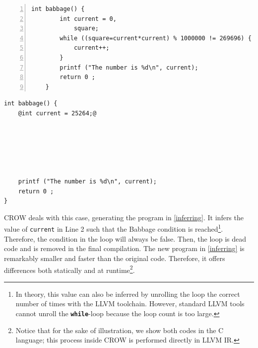 {


\begin{minipage}[t]{0.43\linewidth}
    \begin{lstlisting}[numbers=left]
    int babbage() {
        int current = 0,
            square;
        while ((square=current*current) % 1000000 != 269696) {
            current++;
        }
        printf ("The number is %d\n", current);
        return 0 ;
    }
    \end{lstlisting}
\end{minipage}\hfill
\begin{minipage}[t]{0.44\linewidth}
    \begin{lstlisting}[]
int babbage() {
    @int current = 25264;@
    
    




    printf ("The number is %d\n", current);
    return 0 ;
}
    \end{lstlisting}
\end{minipage}
}

CROW deals with this case, generating the program in \autoref{inferring}. It infers the value of \texttt{current} in Line 2 such that the Babbage condition is reached\footnote{
    In theory, this value can also be inferred by unrolling the loop the correct number of times with the LLVM toolchain.
    However, standard LLVM tools cannot unroll the \texttt{\textbf{while}}-loop because the loop count is too large.}. 
Therefore, the condition in the loop will always be false. Then, the loop is dead code and is removed in the final compilation. 
The new program in \autoref{inferring} is remarkably smaller and faster than the original code. Therefore, it offers differences both statically and at runtime\footnote{ Notice that for the sake of illustration, we show both codes in the C language; this process inside CROW is performed directly in LLVM IR.}.



